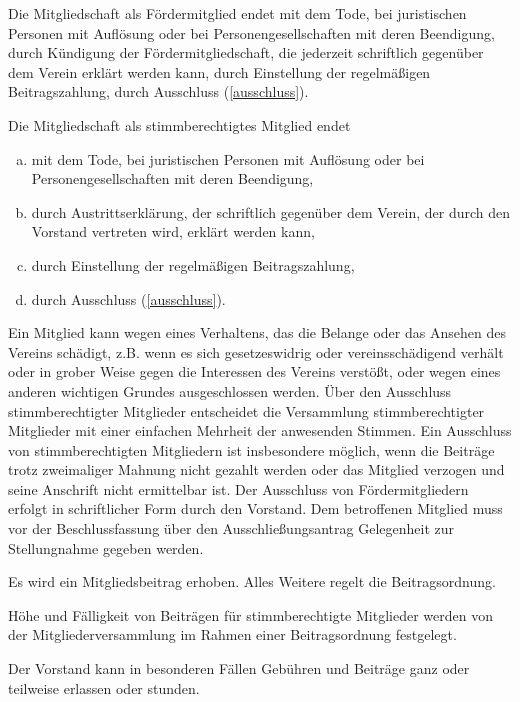 \begin{contract}

    Die Mitgliedschaft als Fördermitglied endet
    mit dem Tode, bei juristischen Personen mit Auflösung oder bei Personengesellschaften mit deren Beendigung,
    durch Kündigung der Fördermitgliedschaft, die jederzeit schriftlich gegenüber dem Verein erklärt werden kann,
    durch Einstellung der regelmäßigen Beitragszahlung,
    durch Ausschluss (\ref{ausschluss}).

    Die Mitgliedschaft als stimmberechtigtes Mitglied endet
    \begin{enumerate}[(a)]
        \item mit dem Tode, bei juristischen Personen mit Auflösung oder bei Personengesellschaften mit deren Beendigung,
        \item durch Austrittserklärung, der schriftlich gegenüber dem Verein, der durch den Vorstand vertreten wird, erklärt werden kann,
        \item durch Einstellung der regelmäßigen Beitragszahlung,
        \item durch Ausschluss (\ref{ausschluss}).
    \end{enumerate}

    Ein Mitglied kann wegen eines Verhaltens, das die Belange oder das Ansehen des Vereins schädigt, z.B. wenn es sich gesetzeswidrig oder vereinsschädigend verhält oder in grober Weise gegen die Interessen des Vereins verstößt, oder wegen eines anderen wichtigen Grundes ausgeschlossen werden. Über den Ausschluss stimmberechtigter Mitglieder entscheidet die Versammlung stimmberechtigter Mitglieder mit einer einfachen Mehrheit der anwesenden Stimmen. Ein Ausschluss von stimmberechtigten Mitgliedern ist insbesondere möglich, wenn die Beiträge trotz zweimaliger Mahnung nicht gezahlt werden oder das Mitglied verzogen und seine Anschrift nicht ermittelbar ist. Der Ausschluss von Fördermitgliedern erfolgt in schriftlicher Form durch den Vorstand. Dem betroffenen Mitglied muss vor der Beschlussfassung über den Ausschließungsantrag Gelegenheit zur Stellungnahme gegeben werden.
    \label{ausschluss}

    Es wird ein Mitgliedsbeitrag erhoben. Alles Weitere regelt die Beitragsordnung.

    Höhe und Fälligkeit von Beiträgen für stimmberechtigte Mitglieder werden von der Mitgliederversammlung im Rahmen einer Beitragsordnung festgelegt.

    Der Vorstand kann in besonderen Fällen Gebühren und Beiträge ganz oder teilweise erlassen oder stunden.

\end{contract}

